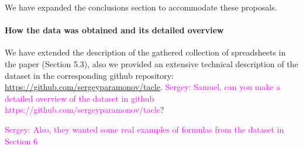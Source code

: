 \documentclass{article}
\newcommand{\sergey}[1]{\textcolor{magenta}{{\sc Sergey:} #1}\xspace}
\begin{document}
We have expanded the conclusions section to accommodate these proposals.


\paragraph{How the data was obtained and its detailed overview}
We have extended the description of the gathered collection of spreadsheets in the paper (Section 5.3), also we provided an extensive technical description of the dataset in the corresponding github repository: \url{https://github.com/sergeyparamonov/tacle}.
\sergey{Samuel, can you make a detailed overview of the dataset in github https://github.com/sergeyparamonov/tacle}?

\sergey{Also, they wanted some real examples of formulas from the dataset in Section 6}
\end{document}
